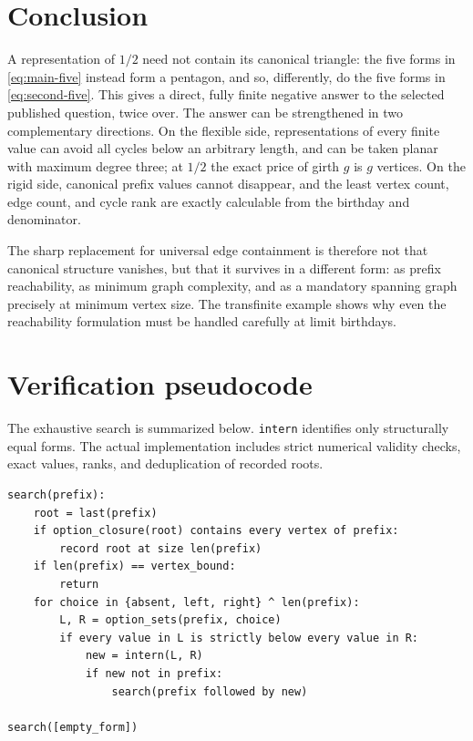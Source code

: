 \documentclass[11pt,a4paper]{article}
\numberwithin{equation}{section}
\theoremstyle{definition}
\theoremstyle{remark}
\newcommand{\code}[1]{\texttt{#1}}
\begin{document}
\section{Conclusion}

A representation of $1/2$ need not contain its canonical triangle: the five
forms in \eqref{eq:main-five} instead form a pentagon, and so, differently, do
the five forms in \eqref{eq:second-five}. This gives a direct, fully finite
negative answer to the selected published question, twice over. The answer can
be strengthened in two complementary directions. On the flexible side,
representations of every finite value can avoid all cycles below an arbitrary
length, and can be taken planar with maximum degree three; at $1/2$ the exact
price of girth $g$ is $g$ vertices. On the rigid side, canonical prefix values
cannot disappear, and the least vertex count, edge count, and cycle rank are
exactly calculable from the birthday and denominator.

The sharp replacement for universal edge containment is therefore not that
canonical structure vanishes, but that it survives in a different form:
as prefix reachability, as minimum graph complexity, and as a mandatory
spanning graph precisely at minimum vertex size. The transfinite example shows
why even the reachability formulation must be handled carefully at limit
birthdays.

\appendix
\section{Verification pseudocode}
\label{app:pseudocode}

The exhaustive search is summarized below. \code{intern} identifies only
structurally equal forms. The actual implementation includes strict numerical
validity checks, exact values, ranks, and deduplication of recorded roots.

\begin{lstlisting}
search(prefix):
    root = last(prefix)
    if option_closure(root) contains every vertex of prefix:
        record root at size len(prefix)
    if len(prefix) == vertex_bound:
        return
    for choice in {absent, left, right} ^ len(prefix):
        L, R = option_sets(prefix, choice)
        if every value in L is strictly below every value in R:
            new = intern(L, R)
            if new not in prefix:
                search(prefix followed by new)

search([empty_form])
\end{lstlisting}
\end{document}
